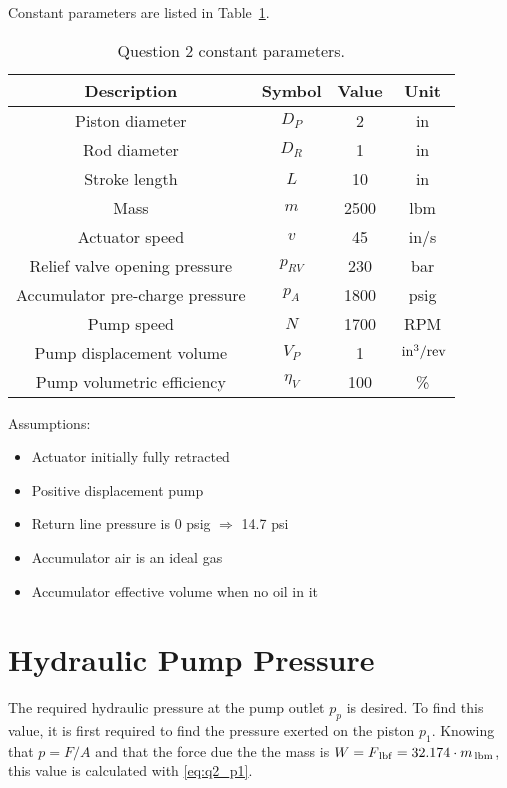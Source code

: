 Constant parameters are listed in Table~\ref{tab:q2_param}. 
\begin{table}[H]
  \centering
  \caption{Question 2 constant parameters.}
    \begin{tabular}{cccc}
    \toprule
    \textbf{Description} & \textbf{Symbol} & \textbf{Value } & \textbf{Unit} \\
    \midrule
    Piston diameter & $D_P$ & 2     & in \\
    Rod diameter & $D_R$ & 1     & in \\
    Stroke length & $L$   & 10    & in \\
    Mass  & $m$   & 2500  & lbm \\
    Actuator speed & $v$   & 45    & in/s \\
    Relief valve opening pressure & $p_{RV}$ & 230   & bar \\
    Accumulator pre-charge pressure & $p_A$ & 1800  & psig \\
    Pump speed & $N$   & 1700  & RPM \\
    Pump displacement volume & $V_P$ & 1     & $\,\mathrm{in^3/rev}$ \\
    Pump volumetric efficiency & $\eta_V$ & 100     & \% \\
    \bottomrule    
    \end{tabular}
  \label{tab:q2_param}%
\end{table}%


Assumptions:
\begin{itemize}
\item Actuator initially fully retracted
\item Positive displacement pump
\item Return line pressure is 0 psig $\Rightarrow$ 14.7 psi
\item Accumulator air is an ideal gas
\item Accumulator effective volume when no oil in it
\end{itemize}

\section{Hydraulic Pump Pressure}

The required hydraulic pressure at the pump outlet $p_p$ is desired. To find this value, it is first required to find the pressure exerted on the piston $p_1$. Knowing that $p=F/A$ and that the force due the the mass is $W= F_{\,\mathrm{lbf}}=32.174\cdot m_{\,\mathrm{lbm}}$, this value is calculated with \ref{eq:q2_p1}.

